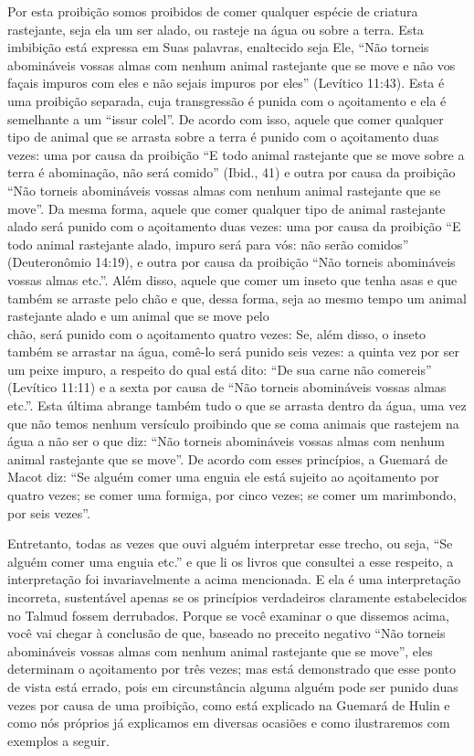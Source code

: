 Por esta proibição somos proibidos de comer qualquer espécie de
criatura rastejante, seja ela um ser alado, ou rasteje na água ou sobre
a terra.
Esta imbibição está expressa em Suas palavras, enaltecido seja Ele,
``Não torneis abomináveis vossas almas com nenhum animal rastejante que se move e
não vos façais impuros com eles e não sejais impuros por eles'' (Levítico
11:43). Esta é uma proibição separada, cuja transgressão é punida com o
açoitamento e ela é semelhante a um ``issur colel''. De acordo com isso,
aquele que comer qualquer tipo de animal que se arrasta sobre a terra é punido com
o açoitamento duas vezes: uma por causa da proibição ``E todo animal
rastejante que se move sobre a terra é abominação, não será comido'' (Ibid., 41) e
outra por causa da proibição ``Não torneis abomináveis vossas almas com
nenhum animal rastejante que se move''. Da mesma forma, aquele que comer
qualquer tipo de animal rastejante alado será punido com o açoitamento duas
vezes: uma por causa da proibição ``E todo animal rastejante alado, impuro será
para vós: não serão comidos'' (Deuteronômio 14:19), e outra por causa da proibição
``Não torneis abomináveis vossas almas etc.''. Além disso, aquele que comer um
inseto que tenha asas e que também se arraste pelo chão e que, dessa
forma, seja ao mesmo tempo um animal rastejante alado e um animal que se move pelo\\
chão, será punido com o açoitamento quatro vezes: Se, além disso, o
inseto também se arrastar na água, comê-lo será punido seis vezes: a quinta vez
por ser um peixe impuro, a respeito do qual está dito: ``De sua carne
não comereis'' (Levítico 11:11) e a sexta por causa de ``Não torneis
abomináveis vossas almas etc.''. Esta última abrange também tudo o que
se arrasta dentro da água, uma vez que não temos nenhum versículo
proibindo que se coma animais que rastejem na água a não ser o que diz:
``Não torneis abomináveis vossas almas com nenhum animal rastejante que
se move''. De acordo com esses princípios, a Guemará de Macot diz: ``Se
alguém comer uma enguia ele está sujeito ao açoitamento por quatro
vezes; se comer uma formiga, por cinco vezes; se comer um marimbondo,
por seis vezes''.

Entretanto, todas as vezes que ouvi alguém interpretar esse trecho, ou
seja, ``Se alguém comer uma enguia etc.'' e que li os livros que
consultei a esse respeito, a interpretação foi invariavelmente a acima
mencionada. E ela é uma interpretação incorreta, sustentável apenas se
os princípios verdadeiros claramente estabelecidos no Talmud fossem
derrubados. Porque se você examinar o que dissemos acima, você vai
chegar à conclusão de que, baseado no preceito negativo ``Não torneis
abomináveis vossas almas com nenhum animal rastejante que se move'',
eles determinam o açoitamento por três vezes; mas está demonstrado que
esse ponto de vista está errado, pois em circunstância alguma alguém
pode ser punido duas vezes por causa de uma proibição, como está
explicado na Guemará de Hulin e como nós próprios já explicamos em
diversas ocasiões e como ilustraremos com exemplos a seguir.

